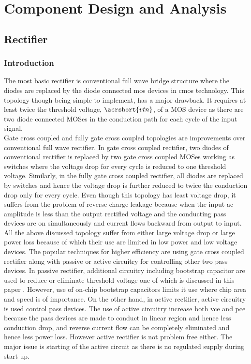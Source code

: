 \documentclass[12pt,a4paper,UKenglish]{report}
\begin{document}
\part{Component Design and Analysis}    

\chapter{Rectifier}  

\section{Introduction}	 	%

The most basic rectifier is conventional full wave bridge structure where the diodes are replaced by the diode connected \acrshort{mos} devices in \acrshort{cmos} technology. This topology though being simple to implement, has a major drawback. It requires at least twice the threshold voltage, $\acrshort{vtn}$, of a MOS device as there are two diode connected MOSes in the conduction path for each cycle of the input signal.  \\

Gate cross coupled and fully gate cross coupled topologies are improvements over conventional full wave rectifier. In gate cross coupled rectifier, two diodes of conventional rectifier is replaced by two gate cross coupled MOSes working as switches where the voltage drop for every cycle is reduced to one threshold voltage. Similarly, in the fully gate cross coupled rectifier, all diodes are replaced by switches and hence the voltage drop is further reduced to twice the conduction drop only for every cycle. Even though this topology has least voltage drop, it suffers from the problem of reverse charge leakage because when the input ac amplitude is less than the output rectified voltage and the conducting pass devices are on simultaneously and current flows backward from output to input. \\

All the above discussed topology suffer from either large voltage drop or large power loss because of which their use are limited in low power and low voltage devices. The popular techniques for higher efficiency are using gate cross coupled rectifier along with passive or active circuitry  for controlling other two pass devices. In passive rectifier, additional circuitry including bootstrap capacitor are used to reduce or eliminate threshold voltage one of which is discussed in this paper \cite{rectboot}. However, use of on-chip bootstrap capacitors limits it use where chip area and speed is of importance. On the other hand, in active rectifier, active circuitry is used control pass devices. The use of active circuitry increase both  \gls{vce} and  \gls{pce} because the pass devices are made to conduct in linear region and hence less conduction drop, and reverse current flow can be completely eliminated and hence less power loss. However active rectifier is not problem free either. The major issue is starting of the active circuit as there is no regulated supply during start up. \\
\end{document}
